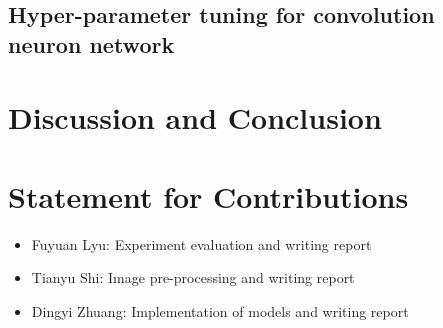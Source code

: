 \documentclass[11pt]{scrartcl}
\begin{document}
\subsection{Hyper-parameter tuning for convolution neuron network}


\section{Discussion and Conclusion}



\section{Statement for Contributions}


\begin{itemize}
	\item Fuyuan Lyu: Experiment evaluation and writing report
	\item Tianyu Shi: Image pre-processing and writing report
	\item Dingyi Zhuang: Implementation of models and writing report
\end{itemize}
\newpage



\end{document}
